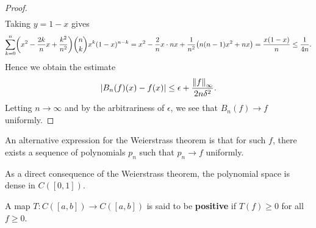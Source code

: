 \begin{proof}
\begin{align*}
    \end{align*}
    Taking $y = 1-x$ gives 
    \begin{equation*}
        \sum_{k=0}^{n}\pth{x^2 - \frac{2k}{n}x + \frac{k^2}{n^2}}\binom{n}{k}x^k(1-x)^{n-k} 
        = x^2 - \frac{2}{n}x\cdot nx + \frac{1}{n^2}\pth{n(n-1)x^2 + nx} 
        = \frac{x(1-x)}{n}\leq \frac{1}{4n}.
    \end{equation*}
    Hence we obtain the estimate
    \begin{equation*}
        \left\lvert {B_n(f)(x) - f(x)} \right\rvert \leq \epsilon + \frac{\left\lVert {f} \right\rVert_\infty}{2n\delta^2}.
    \end{equation*}
    Letting $n\to\infty$ and by the arbitrariness of $\epsilon$, we see that 
    $B_n(f)\to f$ uniformly.
\end{proof}

\begin{remark}
    An alternative expression for the Weierstrass theorem is that for such $f$, 
    there exists a sequence of polynomials $p_n$ such that $p_n\to f$ uniformly.
\end{remark}

\begin{remark}
    As a direct consequence of the Weierstrass theorem, the polynomial space is
    dense in $C([0,1])$.
\end{remark}

\begin{definition}
    A map $T:C([a,b])\to C([a,b])$ is said to be \textbf{positive} if 
    $T(f)\geq 0$ for all $f\geq 0$.
\end{definition}

